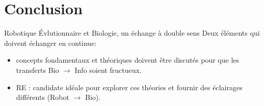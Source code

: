 \documentclass[8pt]{beamer}
\begin{document}
\section{Conclusion}
	
\begin{frame}{Robotique \'Evlutionnaire et Biologie, un échange à double sens}
	Deux éléments qui doivent échanger en continue:
	\begin{itemize}
		\item concepts fondamentaux et théoriques doivent être discutés pour que les transferts Bio $\rightarrow$ Info soient fructueux.
			\vfill
		\item RE : candidate idéale pour explorer ces théories et fournir des éclairages différents (Robot $\rightarrow$ Bio).
	\end{itemize}
		
\end{frame}
\end{document}
